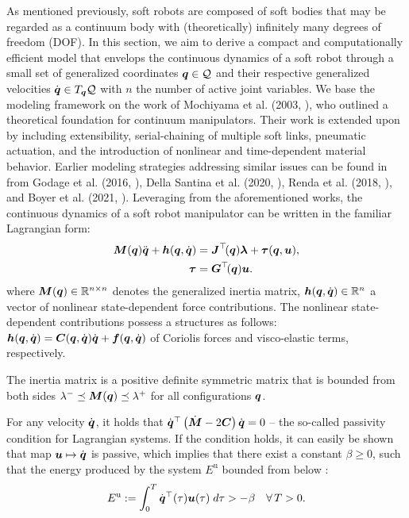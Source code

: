 As mentioned previously, soft robots are composed of soft bodies that may be regarded as a continuum body with (theoretically) infinitely many degrees of freedom (DOF). In this section, we aim to derive a compact and computationally efficient model that envelops the continuous dynamics of a soft robot through a small set of generalized coordinates ${\boldsymbol{q}}\in\mathcal{Q}$ and their respective generalized velocities ${\dot{\boldsymbol{q}}}\in T_{{\boldsymbol{q}}}\mathcal{Q}$ with $n$ the number of active joint variables. We base the modeling framework on the work of Mochiyama et al. (2003, \cite{Mochiyama2003}), who outlined a theoretical foundation for continuum manipulators. Their work is extended upon by including extensibility, serial-chaining of multiple soft links, pneumatic actuation, and the introduction of nonlinear and time-dependent material behavior. Earlier modeling strategies addressing similar issues can be found in from Godage et al. (2016, \cite{Godage2015,Godage2016}), Della Santina et al. (2020, \cite{DellaSantina2020,DellaSantina2020a,DellaSantina2021}), Renda et al.
(2018, \cite{Renda2018}), and Boyer et al. (2021, \cite{Boyer2021}). Leveraging from the aforementioned works, the continuous dynamics of a soft robot manipulator can be written in the familiar Lagrangian form:
%
\begin{align}
{\boldsymbol{M}}({\boldsymbol{q}}) {\ddot{\boldsymbol{q}}} + \boldsymbol{h}({\boldsymbol{q}},{\dot{\boldsymbol{q}}}) & = \boldsymbol{J}^\top\!({\boldsymbol{q}}) \boldsymbol{\lambda} + \boldsymbol{\tau}({\boldsymbol{q}},\boldsymbol{u}), \label{eq:C2:model0}\\
\boldsymbol{\tau} & = \boldsymbol{G}^\top\!({\boldsymbol{q}}) \boldsymbol{u}.
\label{eq:C2:input_model0}
\end{align}
%
where ${\boldsymbol{M}}({\boldsymbol{q}}) \in \mathbb{R}^{n\times n}$ denotes the generalized inertia matrix, $\boldsymbol{h}({\boldsymbol{q}},{\dot{\boldsymbol{q}}}) \in \mathbb{R}^n$ a vector of nonlinear state-dependent force contributions. The nonlinear state-dependent contributions possess a structures as follows: $\boldsymbol{h}({\boldsymbol{q}},{\dot{\boldsymbol{q}}}) = \boldsymbol{C}({\boldsymbol{q}},{\dot{\boldsymbol{q}}}){\dot{\boldsymbol{q}}} + \boldsymbol{f}({\boldsymbol{q}},{\dot{\boldsymbol{q}}})$ of Coriolis forces and visco-elastic terms, respectively.

\begin{asm}
The inertia matrix is a positive definite symmetric matrix that is bounded from both sides $\lambda^{-} \preceq \boldsymbol{M}({\boldsymbol{q}}) \preceq \lambda^{+}$ for all configurations ${\boldsymbol{q}}$.
\end{asm}

\begin{asm}[Passivity]
For any velocity $\dot{{\boldsymbol{q}}}$, it holds that $\dot{{\boldsymbol{q}}}^\top\left(\dot{\boldsymbol{M}} - 2\boldsymbol{C}  \right)\dot{{\boldsymbol{q}}} = 0$ -- the so-called passivity condition for Lagrangian systems. If the condition holds, it can easily be shown that map ${\boldsymbol{u}} \mapsto \dot{{\boldsymbol{q}}}$ is passive, which implies that there exist a constant $\beta \ge 0$, such that the energy produced by the system $E^{\textrm{u}}$ bounded from below \cite{Ortega1998}:
%
\begin{equation}
E^{\textrm{u}} := \int_0^T {\dot{\boldsymbol{q}}}^\top(\tau) {\boldsymbol{u}}(\tau) \;d\tau > -\beta \quad \forall\,T > 0.
\label{as:C2:passivity}
\end{equation}
%
\end{asm}

